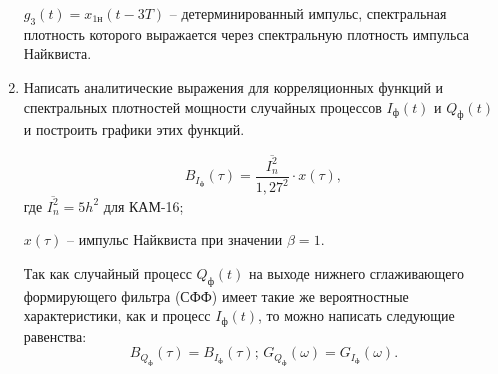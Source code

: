 \documentclass[a4paper, 12pt]{article}
\begin{document}
\begin{enumerate}
  $g_3(t)=x_{1н}(t-3T)$ -- детерминированный импульс,
  спектральная плотность которого выражается через спектральную 
  плотность импульса Найквиста.

  \item Написать аналитические выражения для корреляционных функций
  и спектральных плотностей мощности случайных процессов 
  $I_ф(t)$ и $Q_ф(t)$ и построить графики этих функций.

  \begin{equation}
    B_{I_ф}(\tau)=\frac{\overline{I_n^2}}{1,27^2}\cdot x(\tau),
  \end{equation}
  где $\overline{I^2_n}=5h^2$ для КАМ-16;

  $x(\tau)$ -- импульс Найквиста при значении $\beta=1$.

  Так как случайный процесс $Q_ф(t)$ на выходе нижнего сглаживающего 
  формирующего фильтра (СФФ) имеет такие же вероятностные 
  характеристики, как и процесс $I_ф(t)$, то можно написать 
  следующие равенства:
  \begin{equation}
      B_{Q_ф}(\tau)=B_{I_ф}(\tau);\,
      G_{Q_ф}(\omega)=G_{I_ф}(\omega).
  \end{equation}
  \begin{figure}[H]
    \centering
\end{figure}
\end{enumerate}
\end{document}

